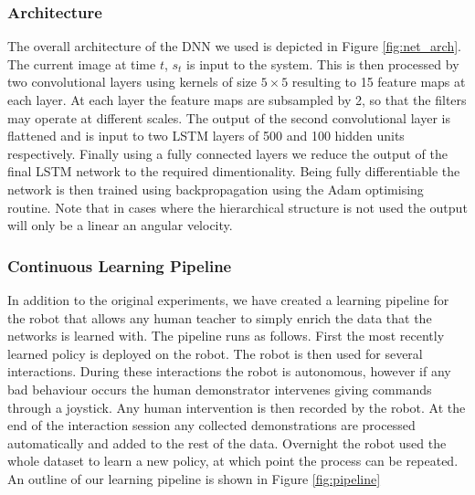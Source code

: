 \documentclass[a4paper,11pt]{report}
\begin{document}
\subsubsection{Architecture}
The overall architecture of the DNN we used is depicted in Figure \ref{fig:net_arch}. The current image at time $t$, $s_t$ is input to the system. This is then processed by two convolutional layers using kernels of size $5\times5$ resulting to 15 feature maps at each layer. At each layer the feature maps are subsampled by 2, so that the filters may operate at different scales. The output of the second convolutional layer is flattened and is input to two LSTM layers of 500 and 100 hidden units respectively. Finally using a fully connected layers we reduce the output of the final LSTM network to the required dimentionality. Being fully differentiable the network is then trained using backpropagation using the Adam optimising routine. Note that in cases where the hierarchical structure is not used the output will only be a linear an angular velocity.



\subsubsection{Continuous Learning Pipeline}
	In addition to the original experiments, we have created a learning pipeline for the robot that allows any human teacher to simply enrich the data that the networks is learned with. The pipeline runs as follows. First the most recently learned policy is deployed on the robot. The robot is then used for several interactions. During these interactions the robot is autonomous, however if any bad behaviour occurs the human demonstrator intervenes giving commands through a joystick. Any human intervention is then recorded by the robot. At the end of the interaction session any collected demonstrations are processed automatically and added to the rest of the data. Overnight the robot used the whole dataset to learn a new policy, at which point the process can be repeated. An outline of our learning pipeline is shown in Figure \ref{fig:pipeline}
	
\end{document}
